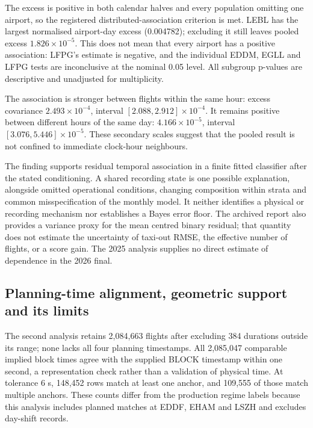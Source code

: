 \documentclass[
  manuscript=article,  %
  layout=preprint,     %
  year=2026,
  volume=4,
]{extra/joas}
\begin{document}
The excess is positive in both calendar halves and every population omitting one airport, so the registered distributed-association criterion is met. LEBL has the largest normalised airport-day excess (0.004782); excluding it still leaves pooled excess \(1.826\times10^{-5}\). This does not mean that every airport has a positive association: LFPG's estimate is negative, and the individual EDDM, EGLL and LFPG tests are inconclusive at the nominal 0.05 level. All subgroup p-values are descriptive and unadjusted for multiplicity.

The association is stronger between flights within the same hour: excess covariance \(2.493\times10^{-4}\), interval \([2.088,2.912]\times10^{-4}\). It remains positive between different hours of the same day: \(4.166\times10^{-5}\), interval \([3.076,5.446]\times10^{-5}\). These secondary scales suggest that the pooled result is not confined to immediate clock-hour neighbours.

The finding supports residual temporal association in a finite fitted classifier after the stated conditioning. A shared recording state is one possible explanation, alongside omitted operational conditions, changing composition within strata and common misspecification of the monthly model. It neither identifies a physical or recording mechanism nor establishes a Bayes error floor. The archived report also provides a variance proxy for the mean centred binary residual; that quantity does not estimate the uncertainty of taxi-out RMSE, the effective number of flights, or a score gain. The 2025 analysis supplies no direct estimate of dependence in the 2026 final.

\subsection{Planning-time alignment, geometric support and its limits}\label{planning-time-alignment-geometric-support-and-its-limits}

The second analysis retains 2,084,663 flights after excluding 384 durations outside its range; none lacks all four planning timestamps. All 2,085,047 comparable implied block times agree with the supplied BLOCK timestamp within one second, a representation check rather than a validation of physical time. At tolerance 6 s, 148,452 rows match at least one anchor, and 109,555 of those match multiple anchors. These counts differ from the production regime labels because this analysis includes planned matches at EDDF, EHAM and LSZH and excludes day-shift records.
\end{document}
